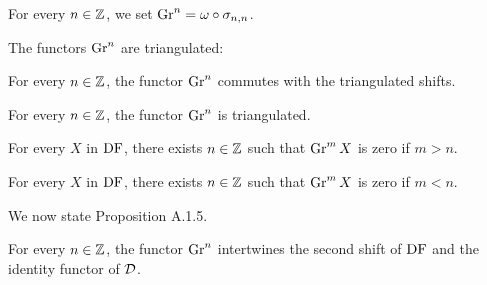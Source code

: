 \begin{definition}
\label{def-Gr}

For every $n\in\mathbb{Z}$, we set $\operatorname{Gr}^n = \omega\circ\sigma_{{n,n}}$.

\end{definition}

The functors $\operatorname{Gr}^n$ are triangulated:

\begin{definition}
\label{def-Gr-commShift}

For every $n\in\mathbb{Z}$, the functor $\operatorname{Gr}^n$ commutes with the triangulated shifts.

\end{definition}

\begin{proposition}
\label{def-Gr-tri}

For every $n\in\mathbb{Z}$, the functor $\operatorname{Gr}^n$ is triangulated.

\end{proposition}

\begin{proposition}
\label{prop-Gr_le}
\leanok
{}
For every $X$ in $\operatorname{DF}$, there exists $n\in\mathbb{Z}$ such that $\operatorname{Gr}^m X$ is zero if 
$m>n$.

\end{proposition}

\begin{proposition}
\label{prop-Gr_ge}
\leanok
{}
For every $X$ in $\operatorname{DF}$, there exists $n\in\mathbb{Z}$ such that $\operatorname{Gr}^m X$ is zero if 
$m<n$.

\end{proposition}


We now state Proposition A.1.5.


\begin{definition}
\label{def-Gr-commShift2}

For every $n\in\mathbb{Z}$, the functor $\operatorname{Gr}^n$ intertwines the second shift of $\operatorname{DF}$ and the identity functor of $\mathcal{D}$.

\end{definition}

